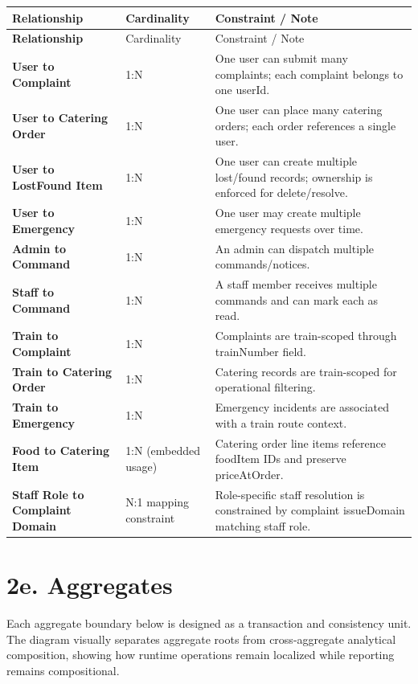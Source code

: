 \documentclass[12pt,a4paper]{report}
\renewcommand{\toprule}{\hline\hline}
\renewcommand{\midrule}{\hline}
\renewcommand{\bottomrule}{\hline\hline}
\begin{document}
\begin{longtable}{>{\bfseries}p{} p{} p{}}
\toprule
\rowcolor{TableHeader}
\textcolor{TableHeaderText}{Relationship} & \textcolor{TableHeaderText}{Cardinality} & \textcolor{TableHeaderText}{Constraint / Note} \\
\midrule
\endfirsthead
\toprule
\rowcolor{TableHeader}
\textcolor{TableHeaderText}{Relationship} & \textcolor{TableHeaderText}{Cardinality} & \textcolor{TableHeaderText}{Constraint / Note} \\
\midrule
\endhead
User to Complaint & 1:N & One user can submit many complaints; each complaint belongs to one userId. \\
User to Catering Order & 1:N & One user can place many catering orders; each order references a single user. \\
User to LostFound Item & 1:N & One user can create multiple lost/found records; ownership is enforced for delete/resolve. \\
User to Emergency & 1:N & One user may create multiple emergency requests over time. \\
Admin to Command & 1:N & An admin can dispatch multiple commands/notices. \\
Staff to Command & 1:N & A staff member receives multiple commands and can mark each as read. \\
Train to Complaint & 1:N & Complaints are train-scoped through trainNumber field. \\
Train to Catering Order & 1:N & Catering records are train-scoped for operational filtering. \\
Train to Emergency & 1:N & Emergency incidents are associated with a train route context. \\
Food to Catering Item & 1:N (embedded usage) & Catering order line items reference foodItem IDs and preserve priceAtOrder. \\
Staff Role to Complaint Domain & N:1 mapping constraint & Role-specific staff resolution is constrained by complaint issueDomain matching staff role. \\
\bottomrule
\end{longtable}

\section{2e. Aggregates}

Each aggregate boundary below is designed as a transaction and consistency unit. The diagram visually separates aggregate roots from cross-aggregate analytical composition, showing how runtime operations remain localized while reporting remains compositional.
\end{document}
